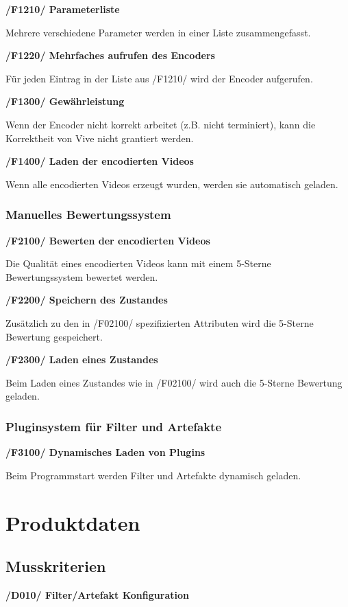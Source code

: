\documentclass[parskip=full]{scrartcl}
\begin{document}
\textbf{/F1210/ Parameterliste}

Mehrere verschiedene Parameter werden in einer Liste zusammengefasst.

\textbf{/F1220/ Mehrfaches aufrufen des Encoders}

Für jeden Eintrag in der Liste aus /F1210/ wird der Encoder aufgerufen.

\textbf{/F1300/ Gewährleistung}

Wenn der Encoder nicht korrekt arbeitet (z.B. nicht terminiert), kann die Korrektheit von Vive nicht grantiert werden.

\textbf{/F1400/ Laden der encodierten Videos}

Wenn alle encodierten Videos erzeugt wurden, werden sie automatisch geladen.
\newpage
\subsubsection{Manuelles Bewertungssystem}
\textbf{/F2100/ Bewerten der encodierten Videos}

Die Qualität eines encodierten Videos kann mit einem 5-Sterne Bewertungssystem bewertet werden.

\textbf{/F2200/ Speichern des Zustandes}

Zusätzlich zu den in /F02100/ spezifizierten Attributen wird die 5-Sterne Bewertung gespeichert.

\textbf{/F2300/ Laden eines Zustandes}

Beim Laden eines Zustandes wie in /F02100/ wird auch die 5-Sterne Bewertung geladen.


\subsubsection{Pluginsystem für Filter und Artefakte}

\textbf{/F3100/ Dynamisches Laden von Plugins}

Beim Programmstart werden Filter und Artefakte dynamisch geladen.



\newpage
\section{Produktdaten}
\subsection{Musskriterien}
\textbf{/D010/ Filter/Artefakt Konfiguration}
\end{document}

